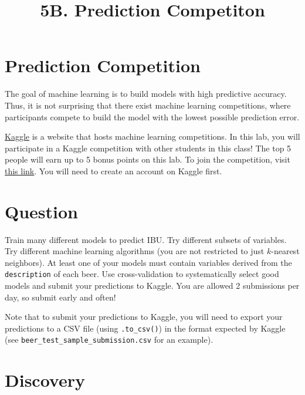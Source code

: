\documentclass[11pt]{article}
\title{5B. Prediction Competiton}
\begin{document}
    
    
    \maketitle
    
    

    
    \hypertarget{prediction-competition}{%
\section{Prediction Competition}\label{prediction-competition}}

The goal of machine learning is to build models with high predictive
accuracy. Thus, it is not surprising that there exist machine learning
competitions, where participants compete to build the model with the
lowest possible prediction error.

\href{http://www.kaggle.com/}{Kaggle} is a website that hosts machine
learning competitions. In this lab, you will participate in a Kaggle
competition with other students in this class! The top 5 people will
earn up to 5 bonus points on this lab. To join the competition, visit
\href{https://www.kaggle.com/c/beer2019}{this link}. You will need to
create an account on Kaggle first.

    \hypertarget{question}{%
\section{Question}\label{question}}

Train many different models to predict IBU. Try different subsets of
variables. Try different machine learning algorithms (you are not
restricted to just \(k\)-nearest neighbors). At least one of your models
must contain variables derived from the \texttt{description} of each
beer. Use cross-validation to systematically select good models and
submit your predictions to Kaggle. You are allowed 2 submissions per
day, so submit early and often!

Note that to submit your predictions to Kaggle, you will need to export
your predictions to a CSV file (using \texttt{.to\_csv()}) in the format
expected by Kaggle (see \texttt{beer\_test\_sample\_submission.csv} for
an example).

    \hypertarget{discovery}{%
\section{Discovery}\label{discovery}}
\end{document}
